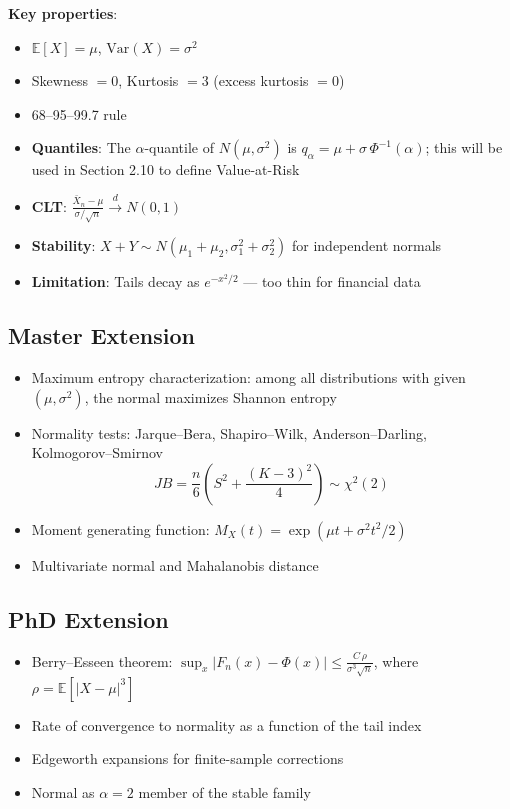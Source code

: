 \documentclass[11pt, a4paper]{article}
\newcommand{\E}{\mathbb{E}}
\newcommand{\Var}{\text{Var}}
\theoremstyle{definition}
\begin{document}
\noindent\textbf{Key properties}:
\begin{itemize}
  \item $\E[X] = \mu$, \quad $\Var(X) = \sigma^2$
  \item Skewness $= 0$, \quad Kurtosis $= 3$ (excess kurtosis $= 0$)
  \item 68--95--99.7 rule
  \item \textbf{Quantiles}: The $\alpha$-quantile of $N(\mu, \sigma^2)$ is $q_\alpha = \mu + \sigma\,\Phi^{-1}(\alpha)$; this will be used in Section 2.10 to define Value-at-Risk
  \item \textbf{CLT}: $\frac{\bar{X}_n - \mu}{\sigma/\sqrt{n}} \xrightarrow{d} N(0,1)$
  \item \textbf{Stability}: $X + Y \sim N(\mu_1+\mu_2, \sigma_1^2+\sigma_2^2)$ for independent normals
  \item \textbf{Limitation}: Tails decay as $e^{-x^2/2}$ — too thin for financial data
\end{itemize}

\subsection{Master Extension}
\begin{itemize}
  \item Maximum entropy characterization: among all distributions with given $(\mu, \sigma^2)$, the normal maximizes Shannon entropy
  \item Normality tests: Jarque--Bera, Shapiro--Wilk, Anderson--Darling, Kolmogorov--Smirnov
  \[
    JB = \frac{n}{6}\left(S^2 + \frac{(K-3)^2}{4}\right) \sim \chi^2(2)
  \]
  \item Moment generating function: $M_X(t) = \exp(\mu t + \sigma^2 t^2 / 2)$
  \item Multivariate normal and Mahalanobis distance
\end{itemize}

\subsection{PhD Extension}
\begin{itemize}
  \item Berry--Esseen theorem: $\sup_x |F_n(x) - \Phi(x)| \leq \frac{C\,\rho}{\sigma^3\sqrt{n}}$, where $\rho = \E[|X-\mu|^3]$
  \item Rate of convergence to normality as a function of the tail index
  \item Edgeworth expansions for finite-sample corrections
  \item Normal as $\alpha = 2$ member of the stable family
\end{itemize}
\end{document}

